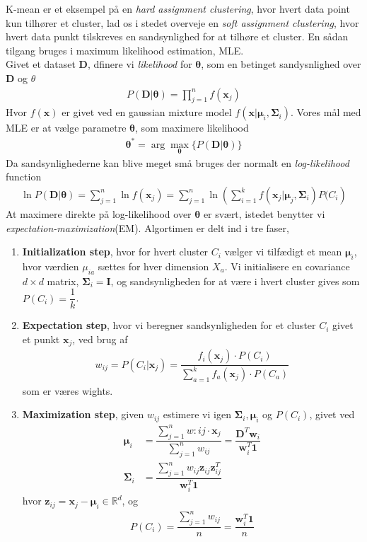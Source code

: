 \documentclass[paper=a4, fontsize=11pt]{scrartcl} %
\numberwithin{equation}{section} %
\numberwithin{figure}{section} %
\numberwithin{table}{section} %
\begin{document}
	K-mean er et eksempel på en \textit{hard assignment clustering}, hvor hvert data point kun tilhører et cluster, lad os i stedet overveje en \textit{soft assignment clustering}, hvor hvert data punkt tilskreves en sandsynlighed for at tilhøre et cluster. En sådan tilgang bruges i maximum likelihood estimation, MLE. \\
	
	Givet et dataset $\mathbf{D}$, dfinere vi \textit{likelihood} for $\mathbf{\theta}$, som en betinget sandysnlighed over $\mathbf{D}$ og $\theta$
	\begin{align*}
	P(\mathbf{D}|\mathbf{\theta})=\prod_{j=1}^{n}f(\mathbf{x}_j)
	\end{align*} 
	Hvor $f(\mathbf{x})$ er givet ved en gaussian mixture model $f(\mathbf{x}|\mathbf{\mu}_i,\mathbf{\Sigma}_i)$. Vores mål med MLE er at vælge parametre $\mathbf{\theta}$, som maximere likelihood
	\begin{align*}
	\mathbf{\theta}^*=\arg\underset{\mathbf{\theta}}{\max}\{P(\mathbf{D}|\mathbf{\theta})\}
	\end{align*}
	Da sandsynlighederne kan blive meget små bruges der normalt en \textit{log-likelihood} function
	\begin{align*}
	\ln P(\mathbf{D}|\mathbf{\theta})=\sum_{j=1}^{n}\ln f(\mathbf{x}_j)=\sum_{j=1}^{n}\ln\left(\sum_{i=1}^{k}f(\mathbf{x}_j|\mathbf{\mu}_j,\mathbf{\Sigma}_i)P(C_i\right)
	\end{align*}
	At maximere direkte på log-likelihood over $\mathbf{\theta}$ er svært, istedet benytter vi \textit{expectation-maximization}(EM). Algortimen er delt ind i tre faser, 
	\begin{enumerate}
		\item \textbf{Initialization step}, hvor for hvert cluster $C_i$ vælger vi tilfædigt et mean $\mathbf{\mu}_i$, hvor værdien $\mu_{ia}$ sættes for hver dimension $X_a$. Vi initialisere en covariance $d\times d$ matrix, $\mathbf{\Sigma}_i=\mathbf{I}$, og sandsynligheden for at være i hvert cluster gives som $P(C_i)=\dfrac{1}{k}$.
		\item \textbf{Expectation step}, hvor vi beregner sandsynligheden for et cluster $C_i$ givet et punkt $\mathbf{x}_j$, ved brug af
		\begin{align*}
		w_{ij}=P(C_i|\mathbf{x}_j)=\dfrac{f_i(\mathbf{x}_j)\cdot P(C_i)}{\sum_{a=1}^{k}f_a(\mathbf{x}_j)\cdot P(C_a)}
		\end{align*}
		som er væres wights.
		\item \textbf{Maximization step}, given $w_{ij}$ estimere vi igen $\mathbf{\Sigma}_i,\mathbf{\mu}_i$ og $P(C_i)$, givet ved 
		\begin{align*}
		\mathbf{\mu}_i&=\dfrac{\sum_{j=1}^{n}w:{ij}\cdot \mathbf{x}_j}{\sum_{j=1}^{n}w_{ij}}=\dfrac{\mathbf{D}^T\mathbf{w}_i}{\mathbf{w}^T_i\mathbf{1}} \\
		\mathbf{\Sigma}_i&=\dfrac{\sum_{j=1}^{n}w_{ij}\mathbf{z}_{ij}\mathbf{z}_{ij}^T}{\mathbf{w}^T_i\mathbf{1}}
		\end{align*}
		hvor $\mathbf{z}_{ij}=\mathbf{x}_j-\mathbf{\mu}_i\in\mathbb{R}^d$, og
		\begin{align*}
		P(C_i)=\dfrac{\sum_{j=1}^{n}w_{ij}}{n}=\dfrac{\mathbf{w}_i^T\mathbf{1}}{n}
		\end{align*}
	\end{enumerate}
\end{document}
